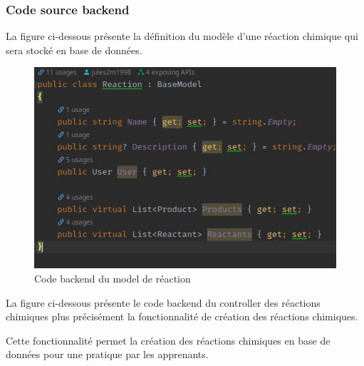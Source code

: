\subsubsection{Code source backend}

La figure ci-dessous présente la définition du modèle d'une réaction chimique qui sera stocké en base de données.


\begin{figure}[H]
	\centering
	\includegraphics[width=1\textwidth]{img/mre}
	\caption{Code backend du model de réaction}
\end{figure}

La figure ci-dessous présente le code backend du controller des réactions chimiques plus précisément la fonctionnalité de création des réactions chimiques.

Cette fonctionnalité permet la création des réactions chimiques en base de données pour une pratique par les apprenants.

